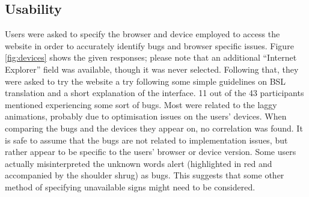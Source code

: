 \documentclass[12pt]{ociamthesis}  %
\begin{document}
\subsection{Usability}
Users were asked to specify the browser and device employed to access the website in order to accurately identify bugs and browser specific issues. Figure \ref{fig:devices} shows the given responses; please note that an additional ``Internet Explorer'' field was available, though it was never selected. Following that, they were asked to try the  website a try following some simple guidelines on BSL translation and a short explanation of the interface. 11 out of the 43 participants mentioned experiencing some sort of bugs. Most were related to the laggy animations, probably due to optimisation issues on the users' devices. When comparing the bugs and the devices they appear on, no correlation was found. It is safe to assume that the bugs are not related to implementation issues, but rather appear to be specific to the users' browser or device version. Some users actually misinterpreted the unknown words alert (highlighted in red and accompanied by the shoulder shrug) as bugs. This suggests that some other method of specifying unavailable signs might need to be considered.

\end{document}
